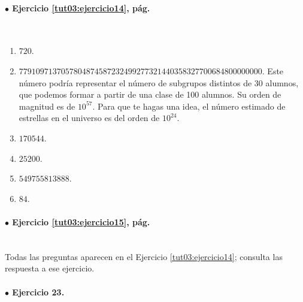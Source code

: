 \documentclass[10pt,a4paper]{article}\usepackage[]{graphicx}\usepackage[]{color}
\begin{document}
\paragraph{\bf $\bullet$ Ejercicio \ref{tut03:ejercicio14}, pág. \pageref{tut03:ejercicio14}}
\label{tut03:ejercicio14:sol}\quad\\

\begin{enumerate}
  \item $720$.
  \item $7791097137057804874587232499277321440358327700684800000000$.
    Este número podría representar el número de subgrupos distintos de 30 alumnos, que podemos formar a partir de una clase de 100 alumnos. Su orden de magnitud es de $10^{57}$. Para que te hagas una idea, el número estimado de estrellas en el universo es del orden de $10^{24}$.
  \item $170544$.
  \item $25200$.
  \item $549755813888$.
  \item $84$.
\end{enumerate}

\paragraph{\bf $\bullet$ Ejercicio \ref{tut03:ejercicio15}, pág. \pageref{tut03:ejercicio15}}
\label{tut03:ejercicio15:sol}\quad\\

Todas las preguntas aparecen en el Ejercicio \ref{tut03:ejercicio14}; consulta las respuesta a ese ejercicio.

\paragraph{\bf $\bullet$ Ejercicio 23.}
\label{tut03:ejercicio23:sol}\quad\\
\end{document}
